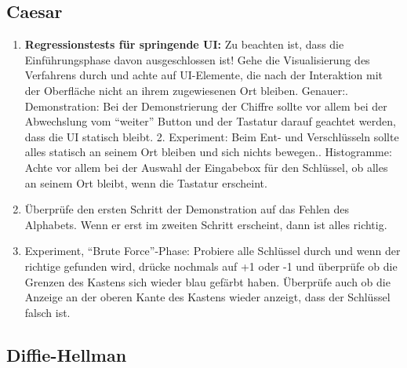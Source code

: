 \documentclass{article}
\begin{document}
 \subsection{Caesar}
  \begin{enumerate}
   \item \textbf{Regressionstests für springende UI:}\newline
         Zu beachten ist, dass die Einführungsphase davon ausgeschlossen ist!\newline
         Gehe die Visualisierung des Verfahrens durch und achte auf UI-Elemente, die nach der Interaktion mit der Oberfläche 
         nicht an ihrem zugewiesenen Ort bleiben. Genauer:. Demonstration: Bei der Demonstrierung der Chiffre sollte vor allem bei der Abwechslung vom ``weiter'' Button und 
            der Tastatur darauf geachtet werden, dass die UI statisch bleibt.
         2. Experiment: Beim Ent- und Verschlüsseln sollte alles statisch an seinem Ort bleiben und sich nichts bewegen.. Histogramme: Achte vor allem bei der Auswahl der Eingabebox für den Schlüssel, ob alles an seinem Ort bleibt, wenn die
            Tastatur erscheint.
   \item Überprüfe den ersten Schritt der Demonstration auf das Fehlen des Alphabets. Wenn er erst im zweiten Schritt erscheint, dann ist
         alles richtig.
   \item Experiment, ``Brute Force''-Phase: Probiere alle Schlüssel durch und wenn der richtige gefunden wird, drücke nochmals auf +1 oder -1
         und überprüfe ob die Grenzen des Kastens sich wieder blau gefärbt haben. Überprüfe auch ob die Anzeige an der oberen Kante
         des Kastens wieder anzeigt, dass der Schlüssel falsch ist.     
  \end{enumerate}
  
  \subsection{Diffie-Hellman}
\end{document}
